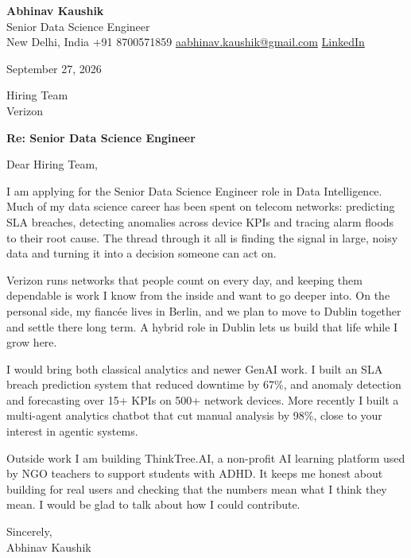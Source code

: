 \documentclass[11pt,a4paper]{article}
\begin{document}
{\Large\bfseries Abhinav Kaushik}\\
Senior Data Science Engineer\\
New Delhi, India \textbar{} +91 8700571859 \textbar{} \href{mailto:aabhinav.kaushik@gmail.com}{aabhinav.kaushik@gmail.com} \textbar{} \href{https://www.linkedin.com/in/abhinav-kaushik10/}{LinkedIn}  

September 27, 2026

Hiring Team\\
Verizon

\textbf{Re: Senior Data Science Engineer}

Dear Hiring Team,

I am applying for the Senior Data Science Engineer role in Data Intelligence. Much of my data science career has been spent on telecom networks: predicting SLA breaches, detecting anomalies across device KPIs and tracing alarm floods to their root cause. The thread through it all is finding the signal in large, noisy data and turning it into a decision someone can act on.

Verizon runs networks that people count on every day, and keeping them dependable is work I know from the inside and want to go deeper into. On the personal side, my fiancée lives in Berlin, and we plan to move to Dublin together and settle there long term. A hybrid role in Dublin lets us build that life while I grow here.

I would bring both classical analytics and newer GenAI work. I built an SLA breach prediction system that reduced downtime by 67\%, and anomaly detection and forecasting over 15+ KPIs on 500+ network devices. More recently I built a multi-agent analytics chatbot that cut manual analysis by 98\%, close to your interest in agentic systems.

Outside work I am building ThinkTree.AI, a non-profit AI learning platform used by NGO teachers to support students with ADHD. It keeps me honest about building for real users and checking that the numbers mean what I think they mean. I would be glad to talk about how I could contribute.

Sincerely,\\[4pt]
Abhinav Kaushik
\end{document}
